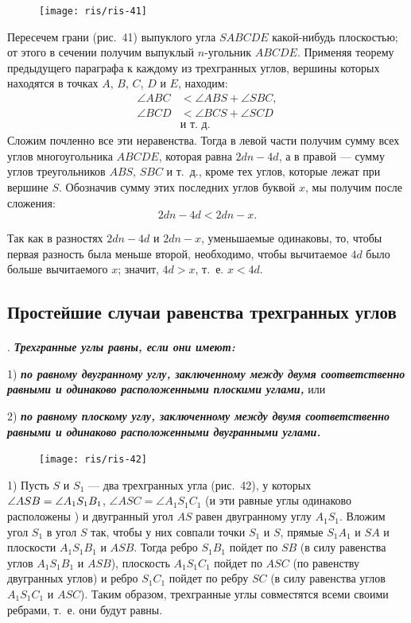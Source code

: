 \documentclass[twoside]{book}
\begin{document}
\begin{figure}[h!]
\centering
\texttt{[image: ris/ris-41]}
\caption{}
\end{figure}

Пересечем грани (рис.~41) выпуклого угла $SABCDE$ какой-нибудь плоскостью;
от этого в сечении получим выпуклый $n$-угольник $ABCDE$.
Применяя теорему предыдущего параграфа к каждому из трехгранных углов, вершины которых находятся в точках $A$, $B$, $C$, $D$ и $E$, находим:
\begin{align*}
\angle ABC &< \angle ABS + \angle SBC,
\\
\angle BCD &< \angle BCS + \angle SCD
\\
&\text{и т.~д.}
\end{align*}
Сложим почленно все эти неравенства.
Тогда в левой части получим сумму всех углов многоугольника $ABCDE$, которая равна $2dn - 4d$, а в правой --- сумму углов треугольников $ABS$, $SBC$ и т.~д., кроме тех углов, которые лежат при вершине $S$.
Обозначив сумму этих последних углов буквой $x$, мы получим после сложения:
\[2dn - 4d < 2dn - x.\]

Так как в разностях $2dn-4d$ и $2dn-x$, уменьшаемые одинаковы, то, чтобы первая разность была меньше второй, необходимо, чтобы вычитаемое $4d$ было больше вычитаемого $x$;
значит, $4d > x$, т.~е. $x < 4d$.

\subsection*{Простейшие случаи равенства трехгранных углов}

\paragraph{}\label{1938/s52}
.
\textbf{\emph{Трехгранные углы равны, если они имеют:}}

1) \textbf{\emph{по равному двугранному углу, заключенному между двумя соответственно равными и одинаково расположенными %
плоскими углами,}} или

2) \textbf{\emph{по равному плоскому углу, заключенному между двумя соответственно равными и одинаково расположенными %
двугранными углами.}}

\begin{figure}[h!]
\centering
\texttt{[image: ris/ris-42]}
\caption{}
\end{figure}

1) Пусть $S$ и $S_1$ --- два трехгранных угла (рис.~42), у которых $\angle ASB\z=\angle A_1S_1B_1$,
$\angle ASC= \angle A_1S_1C_1$ (и эти равные углы одинаково расположены%
) и двугранный угол $AS$ равен двугранному углу $A_1S_1$.
Вложим угол $S_1$ в угол $S$ так, чтобы у них совпали точки $S_1$ и $S$, прямые $S_1A_1$ и $SA$ и плоскости $A_1S_1B_1$ и $ASB$.
Тогда ребро $S_1B_1$ пойдет по $SB$ (в силу равенства углов $A_1S_1B_1$ и $ASB$), плоскость $A_1S_1C_1$ пойдет по $ASC$ (по равенству двугранных углов) и ребро $S_1C_1$ пойдет по ребру $SC$ (в силу равенства углов $A_1S_1C_1$ и $ASC$).
Таким образом, трехгранные углы совместятся всеми своими ребрами, т.~е. они будут равны.
\end{document}
